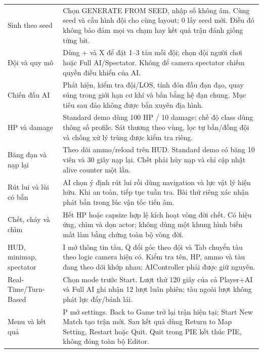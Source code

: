 \begin{longtable}{p{.24\linewidth}p{.68\linewidth}}
Sinh theo seed & Chọn GENERATE FROM SEED, nhập số không âm. Cùng seed và cấu hình đội cho cùng layout; 0 lấy seed mới. Điều đó không bảo đảm mọi va chạm hay kết quả trận đánh giống từng bit. \\
Đội và quy mô & Dùng + và X để đặt 1--3 tàu mỗi đội; chọn đội người chơi hoặc Full AI/Spectator. Không để camera spectator chiếm quyền điều khiển của AI. \\
Chiến đấu AI & Phát hiện, kiểm tra đội/LOS, tính đón đầu đạn đạo, quay súng trong giới hạn cơ khí và bắn bằng hệ đạn chung. Mục tiêu sau đảo không được bắn xuyên địa hình. \\
HP và damage & Standard demo dùng 100 HP / 10 damage; chế độ class dùng thông số profile. Sát thương theo vùng, lọc tự bắn/đồng đội và chống xử lý trùng được kiểm tra riêng. \\
Băng đạn và nạp lại & Theo dõi ammo/reload trên HUD. Standard demo có băng 10 viên và 30 giây nạp lại. Chết phải hủy nạp và chỉ cập nhật alive counter một lần. \\
Rút lui và lùi có bắn & AI chọn ý định rút lui rồi dùng navigation và lực vật lý hiện hữu. Khi an toàn, tiếp tục tuần tra. Bài thử riêng xác nhận phát bắn trong lúc vận tốc tiến âm. \\
Chết, cháy và chìm & Hết HP hoặc capsize hợp lệ kích hoạt vòng đời chết. Có hiệu ứng, chìm và dọn actor; không dùng một khung hình biến mất làm bằng chứng toàn bộ vòng đời. \\
HUD, minimap, spectator & I mở thông tin tàu, Q đổi góc theo đội và Tab chuyển tàu theo logic camera hiện có. Kiểm tra tên, HP, ammo và tàu đang theo dõi khớp nhau; AIController phải được giữ nguyên. \\
Real-Time/Turn-Based & Chọn mode trước Start. Lượt thử 120 giây của cả Player+AI và Full AI ghi nhận 12 lượt luân phiên; tàu ngoài lượt không phát lực đẩy/bánh lái. \\
Menu và kết quả & P mở settings. Back to Game trở lại trận hiện tại; Start New Match tạo trận mới. Sau kết quả dùng Return to Map Setting, Restart hoặc Quit. Quit trong PIE kết thúc PIE, không đóng toàn bộ Editor. \\
\bottomrule
\end{longtable}


